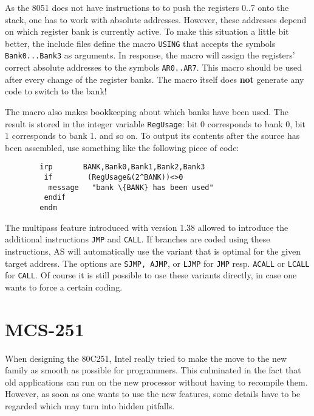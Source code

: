 \documentclass[12pt,twoside]{report}
\newcommand{\bb}[1]{{\bf #1}}
\newcommand{\tty}[1]{{\tt #1}}
\newcommand{\asname}{{AS}}
\begin{document}
As the 8051 does not have instructions to to push the registers 0..7
onto the stack, one has to work with absolute addresses.  However,
these addresses depend on which register bank is currently active.
To make this situation a little bit better, the include files define
the macro \tty{USING} that accepts the symbols \tty{Bank0...Bank3} as arguments.
In response, the macro will assign the registers' correct absolute
addresses to the symbols \tty{AR0..AR7}.  This macro should be used after
every change of the register banks.  The macro itself does \bb{not}
generate any code to switch to the bank!

The macro also makes bookkeeping about which banks have been used.
The result is stored in the integer variable \tty{RegUsage}: bit 0
corresponds to bank 0, bit 1 corresponds to bank 1. and so on.  To
output its contents after the source has been assembled, use
something like the following piece of code:
\begin{verbatim}
        irp       BANK,Bank0,Bank1,Bank2,Bank3
         if        (RegUsage&(2^BANK))<>0
          message   "bank \{BANK} has been used"
         endif
        endm
\end{verbatim}
The multipass feature introduced with version 1.38 allowed to introduce
the additional instructions \tty{JMP} and \tty{CALL}.  If branches are
coded using these instructions, \asname{} will automatically use the variant that
is optimal for the given target address.  The options are \tty{SJMP,
AJMP}, or \tty{LJMP} for \tty{JMP} resp. \tty{ACALL} or \tty{LCALL} for
\tty{CALL}.  Of course it is still possible to use these variants
directly, in case one wants to force a certain coding.


\section{MCS-251}

When designing the 80C251, Intel really tried to make the move to
the new family as smooth as possible for programmers.  This
culminated in the fact that old applications can run on the new
processor without having to recompile them.  However, as soon as one
wants to use the new features, some details have to be regarded which
may turn into hidden pitfalls.
\end{document}
